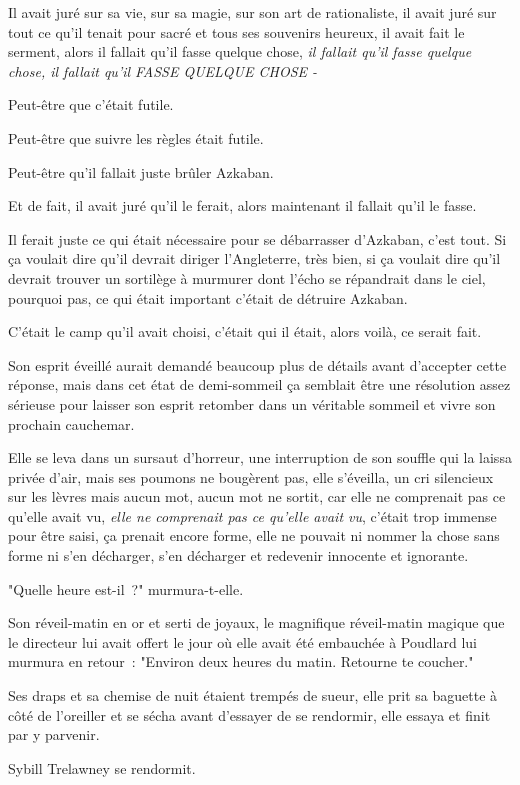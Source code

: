 Il avait juré sur sa vie, sur sa magie, sur son art de rationaliste, il avait juré sur tout ce qu'il tenait pour sacré et tous ses souvenirs heureux, il avait fait le serment, alors il fallait qu'il fasse quelque chose, \emph{il fallait qu'il fasse quelque chose, il fallait qu'il FASSE QUELQUE CHOSE -}

Peut-être que c'était futile.

Peut-être que suivre les règles était futile.

Peut-être qu'il fallait juste brûler Azkaban.

Et de fait, il avait juré qu'il le ferait, alors maintenant il fallait qu'il le fasse.

Il ferait juste ce qui était nécessaire pour se débarrasser d'Azkaban, c'est tout. Si ça voulait dire qu'il devrait diriger l'Angleterre, très bien, si ça voulait dire qu'il devrait trouver un sortilège à murmurer dont l'écho se répandrait dans le ciel, pourquoi pas, ce qui était important c'était de détruire Azkaban.

C'était le camp qu'il avait choisi, c'était qui il était, alors voilà, ce serait fait.

Son esprit éveillé aurait demandé beaucoup plus de détails avant d'accepter cette réponse, mais dans cet état de demi-sommeil ça semblait être une résolution assez sérieuse pour laisser son esprit retomber dans un véritable sommeil et vivre son prochain cauchemar.


Elle se leva dans un sursaut d'horreur, une interruption de son souffle qui la laissa privée d'air, mais ses poumons ne bougèrent pas, elle s'éveilla, un cri silencieux sur les lèvres mais aucun mot, aucun mot ne sortit, car elle ne comprenait pas ce qu'elle avait vu, \emph{elle ne comprenait pas ce qu'elle avait vu}, c'était trop immense pour être saisi, ça prenait encore forme, elle ne pouvait ni nommer la chose sans forme ni s'en décharger, s'en décharger et redevenir innocente et ignorante.

"Quelle heure est-il~?" murmura-t-elle.

Son réveil-matin en or et serti de joyaux, le magnifique réveil-matin magique que le directeur lui avait offert le jour où elle avait été embauchée à Poudlard lui murmura en retour~: "Environ deux heures du matin. Retourne te coucher."

Ses draps et sa chemise de nuit étaient trempés de sueur, elle prit sa baguette à côté de l'oreiller et se sécha avant d'essayer de se rendormir, elle essaya et finit par y parvenir.

Sybill Trelawney se rendormit. 

